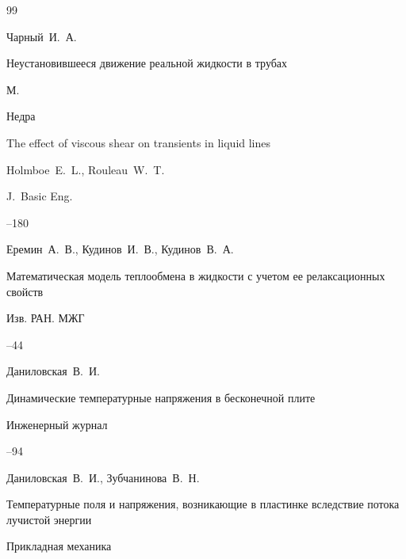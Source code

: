 \begin{thebibliography}{99}

\by Чарный~И.~А.

\book Неустановившееся движение реальной жидкости в трубах

\publaddr М.

\publ Недра







\paper The effect of viscous shear on transients in liquid lines

\by 	Holmboe~E.~L., Rouleau~W.~T.


\jour J.~Basic Eng.



--180 




\by Еремин~А.~В., Кудинов~И.~В., Кудинов~В.~А.

\paper Математическая модель теплообмена в жидкости с учетом ее релаксационных свойств

\jour Изв. РАН. МЖГ



--44







\by Даниловская~В.~И.

\paper Динамические температурные напряжения в бесконечной плите

\jour Инженерный журнал




--94




\by Даниловская~В.~И., Зубчанинова~В.~Н.

\paper Температурные поля и напряжения, возникающие в пластинке вследствие потока лучистой энергии

\jour Прикладная механика


\end{thebibliography}
